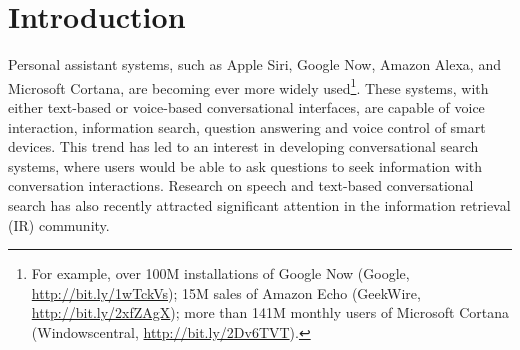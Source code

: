 \section{Introduction}
\label{sec:intro}




Personal assistant systems, such as Apple Siri, Google Now, Amazon Alexa, and Microsoft Cortana, are becoming ever more widely used\footnote{For example, over 100M installations of Google Now (Google, \url{http://bit.ly/1wTckVs}); 15M sales of Amazon Echo (GeekWire, \url{http://bit.ly/2xfZAgX}); more than 141M monthly users of Microsoft Cortana (Windowscentral, \url{http://bit.ly/2Dv6TVT}).}. These systems, with either text-based or voice-based conversational interfaces, are capable of voice interaction, information search, question answering and voice control of smart devices. This trend has led to an interest in developing conversational search systems, where users would be able to ask questions to seek information with conversation interactions. Research on speech and text-based conversational search has also recently attracted significant attention in the information retrieval (IR) community.




